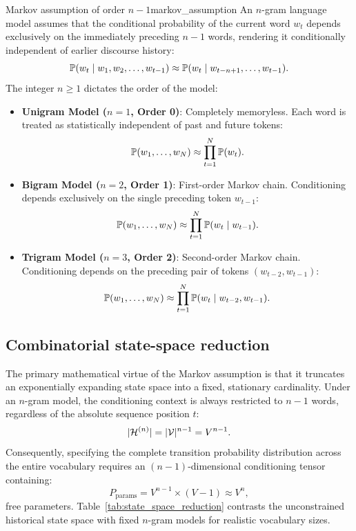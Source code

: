 \documentclass[../../main.tex]{subfiles}
\begin{document}
\begin{definition}{Markov assumption of order $n-1$}{markov_assumption}
An $n$-gram language model assumes that the conditional probability of the current word $w_t$ depends exclusively on the immediately preceding $n-1$ words, rendering it conditionally independent of earlier discourse history:
\begin{equation}
\label{eq:markov_approx}
\mathbb{P}(w_t \mid w_1, w_2, \dots, w_{t-1}) \approx \mathbb{P}(w_t \mid w_{t-n+1}, \dots, w_{t-1}).
\end{equation}
The integer $n \ge 1$ dictates the order of the model:
\begin{itemize}
    \item \textbf{Unigram Model ($n=1$, Order 0)}: Completely memoryless. Each word is treated as statistically independent of past and future tokens:
    \[
    \mathbb{P}(w_1, \dots, w_N) \approx \prod_{t=1}^N \mathbb{P}(w_t).
    \]
    \item \textbf{Bigram Model ($n=2$, Order 1)}: First-order Markov chain. Conditioning depends exclusively on the single preceding token $w_{t-1}$:
    \[
    \mathbb{P}(w_1, \dots, w_N) \approx \prod_{t=1}^N \mathbb{P}(w_t \mid w_{t-1}).
    \]
    \item \textbf{Trigram Model ($n=3$, Order 2)}: Second-order Markov chain. Conditioning depends on the preceding pair of tokens $(w_{t-2}, w_{t-1})$:
    \[
    \mathbb{P}(w_1, \dots, w_N) \approx \prod_{t=1}^N \mathbb{P}(w_t \mid w_{t-2}, w_{t-1}).
    \]
\end{itemize}
\end{definition}

\subsection{Combinatorial state-space reduction}
The primary mathematical virtue of the Markov assumption is that it truncates an exponentially expanding state space into a fixed, stationary cardinality. Under an $n$-gram model, the conditioning context is always restricted to $n-1$ words, regardless of the absolute sequence position $t$:
\begin{equation}
\label{eq:state_space_markov}
|\mathcal{H}^{(n)}| = |\mathcal{V}|^{n-1} = V^{n-1}.
\end{equation}
Consequently, specifying the complete transition probability distribution across the entire vocabulary requires an $(n-1)$-dimensional conditioning tensor containing:
\begin{equation}
\label{eq:parameters_ngram}
P_{\text{params}} = V^{n-1} \times (V - 1) \approx V^n,
\end{equation}
free parameters. Table~\ref{tab:state_space_reduction} contrasts the unconstrained historical state space with fixed $n$-gram models for realistic vocabulary sizes.
\end{document}
